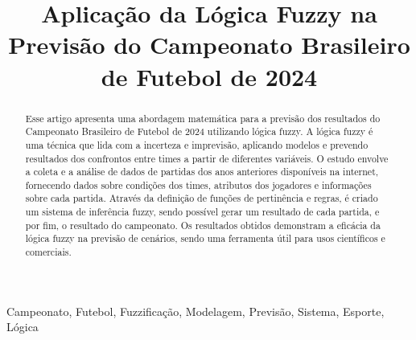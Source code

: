 \documentclass[conference]{IEEEtran}
\begin{document}
\title{Aplicação da Lógica Fuzzy na Previsão do Campeonato Brasileiro de Futebol de 2024 \\}

\author{
    \and
}

\maketitle

\begin{abstract}
Esse artigo apresenta uma abordagem matemática para a previsão dos resultados do 
Campeonato Brasileiro de Futebol de 2024 utilizando lógica fuzzy. 
A lógica fuzzy é uma técnica que lida com a incerteza e imprevisão, aplicando 
modelos e prevendo resultados dos confrontos entre times a partir de diferentes 
variáveis. O estudo envolve a coleta e a análise de dados de partidas dos anos 
anteriores disponíveis na internet, fornecendo dados sobre condições dos times, 
atributos dos jogadores e informações sobre cada partida.
Através da definição de funções de pertinência e regras, é criado um sistema de 
inferência fuzzy, sendo possível gerar um resultado de cada partida, e por fim, 
o resultado do campeonato. 
Os resultados obtidos demonstram a eficácia da lógica fuzzy na previsão de 
cenários, sendo uma ferramenta útil para usos científicos e comerciais. 
\end{abstract}

\begin{IEEEkeywords}
Campeonato, Futebol, Fuzzificação, Modelagem, Previsão, Sistema, Esporte, Lógica
\end{IEEEkeywords}
\end{document}
